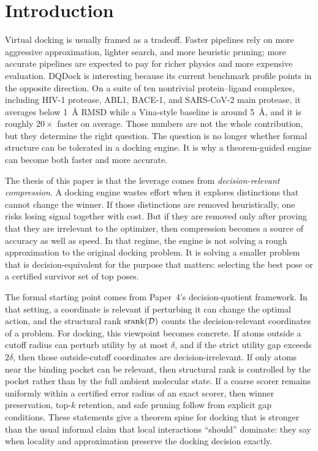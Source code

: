 \section{Introduction}\label{sec:introduction}

Virtual docking is usually framed as a tradeoff. Faster pipelines rely on more aggressive approximation, lighter search, and more heuristic pruning; more accurate pipelines are expected to pay for richer physics and more expensive evaluation. DQDock is interesting because its current benchmark profile points in the opposite direction. On a suite of ten nontrivial protein--ligand complexes, including HIV-1 protease, ABL1, BACE-1, and SARS-CoV-2 main protease, it averages below 1~\AA{} RMSD while a Vina-style baseline is around 5~\AA{}, and it is roughly $20\times$ faster on average. Those numbers are not the whole contribution, but they determine the right question. The question is no longer whether formal structure can be tolerated in a docking engine. It is why a theorem-guided engine can become both faster and more accurate.

The thesis of this paper is that the leverage comes from \emph{decision-relevant compression}. A docking engine wastes effort when it explores distinctions that cannot change the winner. If those distinctions are removed heuristically, one risks losing signal together with cost. But if they are removed only after proving that they are irrelevant to the optimizer, then compression becomes a source of accuracy as well as speed. In that regime, the engine is not solving a rough approximation to the original docking problem. It is solving a smaller problem that is decision-equivalent for the purpose that matters: selecting the best pose or a certified survivor set of top poses.

The formal starting point comes from Paper~4's decision-quotient framework. In that setting, a coordinate is relevant if perturbing it can change the optimal action, and the structural rank $\operatorname{srank}(\mathcal D)$ counts the decision-relevant coordinates of a problem. For docking, this viewpoint becomes concrete. If atoms outside a cutoff radius can perturb utility by at most $\delta$, and if the strict utility gap exceeds $2\delta$, then those outside-cutoff coordinates are decision-irrelevant. If only atoms near the binding pocket can be relevant, then structural rank is controlled by the pocket rather than by the full ambient molecular state. If a coarse scorer remains uniformly within a certified error radius of an exact scorer, then winner preservation, top-$k$ retention, and safe pruning follow from explicit gap conditions. These statements give a theorem spine for docking that is stronger than the usual informal claim that local interactions ``should'' dominate: they say when locality and approximation preserve the docking decision exactly.

